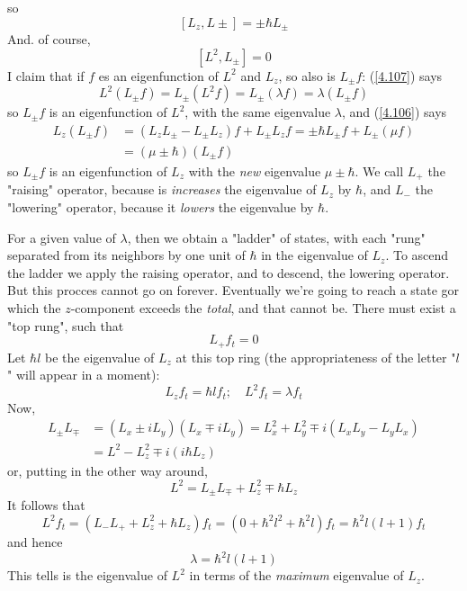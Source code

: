 so
\begin{equation}\label{4.106}
	[L_z,L{\pm}]=\pm \hbar L_{\pm}
\end{equation}
And. of course, 
\begin{equation}\label{4.107}
	[L^2,L_{\pm}]=0
\end{equation}
I claim that if $f$ es an eigenfunction of $L^2$ and $L_z$, so also is $L_{\pm} f$: (\ref{4.107}) says
\begin{equation}\label{4.108}
	L^2(L_{\pm}f)=L_{\pm}(L^2 f)=L_{\pm}(\lambda f)=\lambda(L_{\pm}f)
\end{equation}
so $L_{\pm}f$ is an eigenfunction of $L^2$, with the same eigenvalue $\lambda$, and (\ref{4.106}) says
\begin{align}
\nonumber	L_z(L_{\pm}f)&=(L_zL_{\pm}-L_{\pm}L_z)f+L_{\pm}L_zf=\pm\hbar L_{\pm}f+L_{\pm}(\mu f)\\
											 &=(\mu\pm \hbar)(L_{\pm}f)\label{4.109}
\end{align}
so $L_{\pm} f$ is an eigenfunction of $L_z$ with the \textit{new} eigenvalue $\mu\pm\hbar$. We call $L_+$ the "raising" operator, because is \textit{increases} the eigenvalue of $L_z$ by $\hbar$, and $L_-$ the "lowering" operator, because it \textit{lowers} the eigenvalue by $\hbar$.

For a given value of $\lambda$, then we obtain a "ladder" of states, with each "rung" separated from its neighbors by one unit of $\hbar$ in the eigenvalue of $L_z$. To ascend the ladder we apply the raising operator, and to descend, the lowering operator. But this procces cannot go on forever. Eventually we're going to reach a state gor which the $z$-component exceeds the \textit{total}, and that cannot be. There must exist a "top rung", such that
\begin{equation}\label{4.110}
	L_+f_t=0
\end{equation}
Let $\hbar l$ be the eigenvalue of $L_z$ at this top ring (the appropriateness of the letter "$l$" will appear in a moment):
\begin{equation}\label{4.111}
	L_zf_t=\hbar lf_t;\quad L^2f_t=\lambda f_t
\end{equation}
Now,
\begin{align*}
	L_{\pm}L_{\mp}&=(L_x\pm iL_y)(L_x\mp iL_y)=L_x^2+L_y^2\mp i(L_xL_y-L_yL_x)\\
								&=L^2-L_z^2\mp i(i\hbar L_z)
\end{align*}
or, putting in the other way around,
\begin{equation}\label{4.112}
	L^2=L_{\pm}L_{\mp}+L_z^2\mp \hbar L_z
\end{equation}
It follows that
$$L^2f_t=(L_-L_++L_z^2+\hbar L_z)f_t=(0+\hbar^2l^2+\hbar^2l)f_t=\hbar^2l(l+1)f_t$$ and hence
\begin{equation}\label{4.113}
	\lambda = \hbar^2l(l+1)
\end{equation}
This tells is the eigenvalue of $L^2$ in terms of the \textit{maximum} eigenvalue of $L_z$.

